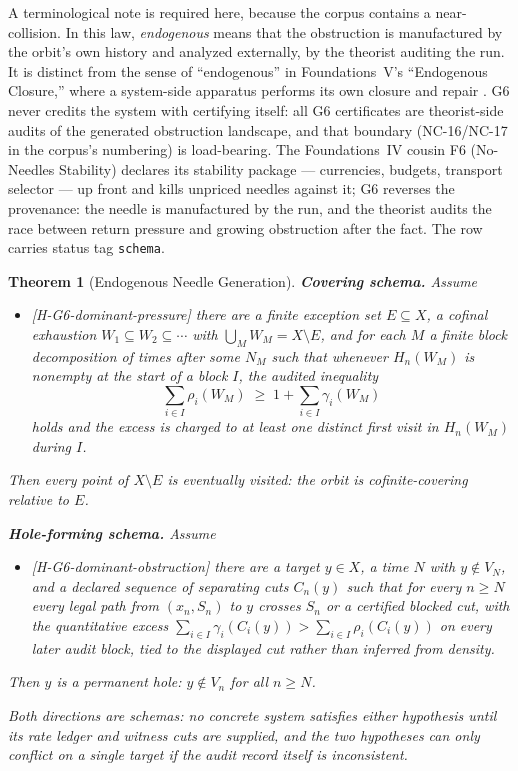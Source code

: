 \documentclass[11pt]{article}
\newcommand{\lawGSix}{Endogenous Needle Generation}
\newtheorem{theorem}{Theorem}[section]
\theoremstyle{definition}
\begin{document}
A terminological note is required here, because the corpus contains a near-collision. In this law,
\emph{endogenous} means that the obstruction is manufactured by the orbit's own history and analyzed
externally, by the theorist auditing the run. It is distinct from the sense of ``endogenous'' in
Foundations~V's ``Endogenous Closure,'' where a system-side apparatus performs its own closure and
repair \citep{FoundationsVCognition}. G6 never credits the system with certifying itself: all G6
certificates are theorist-side audits of the generated obstruction landscape, and that boundary
(NC-16/NC-17 in the corpus's numbering) is load-bearing. The Foundations~IV cousin F6 (No-Needles
Stability) declares its stability package --- currencies, budgets, transport selector --- up front
and kills unpriced needles against it; G6 reverses the provenance: the needle is manufactured by the
run, and the theorist audits the race between return pressure and growing obstruction after the
fact. The row carries status tag \texttt{schema}.

\begin{theorem}[\lawGSix]\label{thm:G6}
\textbf{Covering schema.} Assume
\begin{itemize}
  \item \textup{[H-G6-dominant-pressure]} there are a finite exception set $E \subseteq X$, a cofinal
    exhaustion $W_1 \subseteq W_2 \subseteq \cdots$ with $\bigcup_M W_M = X \setminus E$, and for
    each $M$ a finite block decomposition of times after some $N_M$ such that whenever $H_n(W_M)$ is
    nonempty at the start of a block $I$, the audited inequality
    \[
      \sum_{i \in I} \rho_i(W_M) \;\ge\; 1 + \sum_{i \in I} \gamma_i(W_M)
    \]
    holds and the excess is charged to at least one distinct first visit in $H_n(W_M)$ during $I$.
\end{itemize}
Then every point of $X \setminus E$ is eventually visited: the orbit is cofinite-covering relative to
$E$.

\textbf{Hole-forming schema.} Assume
\begin{itemize}
  \item \textup{[H-G6-dominant-obstruction]} there are a target $y \in X$, a time $N$ with
    $y \notin V_N$, and a declared sequence of separating cuts $C_n(y)$ such that for every
    $n \ge N$ every legal path from $(x_n, S_n)$ to $y$ crosses $S_n$ or a certified blocked cut,
    with the quantitative excess $\sum_{i \in I} \gamma_i(C_i(y)) > \sum_{i \in I} \rho_i(C_i(y))$ on
    every later audit block, tied to the displayed cut rather than inferred from density.
\end{itemize}
Then $y$ is a permanent hole: $y \notin V_n$ for all $n \ge N$.

Both directions are schemas: no concrete system satisfies either hypothesis until its rate ledger and
witness cuts are supplied, and the two hypotheses can only conflict on a single target if the audit
record itself is inconsistent.
\end{theorem}
\end{document}
